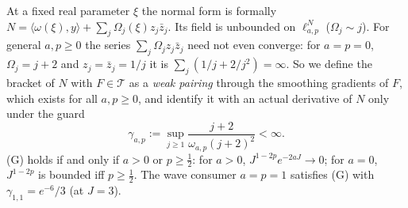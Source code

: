At a fixed real parameter $\xi$ the normal form is formally $N=\langle\omega(\xi),y\rangle+\sum_j\Omega_j(\xi)z_j\bar z_j$.
Its field is unbounded on $\ell^N_{a,p}$ ($\Omega_j\sim j$). For general $a,p\ge0$ the series $\sum_j\Omega_jz_j\bar z_j$
need not even converge: for $a=p=0$, $\Omega_j=j+2$ and $z_j=\bar z_j=1/j$ it is $\sum_j(1/j+2/j^2)=\infty$. So we
define the bracket of $N$ with $F\in\mathcal T$ as a \emph{weak pairing} through the smoothing gradients of $F$, which
exists for all $a,p\ge0$, and identify it with an actual derivative of $N$ only under the guard
\begin{equation}\label{bpW:w4:guard}
\gamma_{a,p}:=\sup_{j\ge1}\frac{j+2}{\omega_{a,p}(j+2)^2}<\infty.\tag{G}
\end{equation}
(G) holds if and only if $a>0$ or $p\ge\frac12$: for $a>0$, $J^{1-2p}e^{-2aJ}\to0$; for $a=0$, $J^{1-2p}$ is bounded iff
$p\ge\frac12$. The wave consumer $a=p=1$ satisfies (G) with $\gamma_{1,1}=e^{-6}/3$ (at $J=3$).

